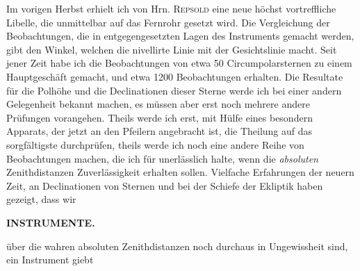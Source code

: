 \par\indent Im vorigen Herbst erhielt ich von Hrn. \textsc{Repsold} eine neue höchst vortreffliche Libelle, die unmittelbar auf das Fernrohr gesetzt wird. Die Vergleichung der Beobachtungen, die in entgegengesetzten Lagen des Instruments gemacht werden, gibt den Winkel, welchen die nivellirte Linie mit der Gesichtslinie macht. Seit jener Zeit habe ich die Beobachtungen von etwa 50 Circumpolarsternen zu einem Hauptgeschäft gemacht, und etwa 1200 Beobachtungen erhalten. Die Resultate für die Polhöhe
und die Declinationen dieser Sterne werde ich bei einer andern Gelegenheit bekannt machen, es müssen aber erst noch mehrere andere Prüfungen vorangehen. Theils werde ich erst, mit Hülfe eines besondern Apparats, der jetzt an den Pfeilern angebracht ist, die Theilung auf das sorgfältigste durchprüfen, theils werde ich noch eine andere Reihe von Beobachtungen machen, die ich für unerlässlich
halte, wenn die \emph{absoluten} Zenithdistanzen Zuverlässigkeit erhalten sollen. Vielfache Erfahrungen der
neuern Zeit, an Declinationen von Sternen und bei der Schiefe der Ekliptik haben gezeigt, dass wir \par
\clearpage
\endgroup
\begingroup
\pagestyle{empty}
\newcommand{\GaussVICitation}[2]{%
  \begin{center}
  \parbox{#1\linewidth}{%
    \centering\footnotesize\frenchspacing
    \hrule height .3pt\relax\vspace{2.5pt}
    #2\par
    \vspace{2.5pt}\hrule height .3pt\relax
  }%
  \end{center}
  \par\nobreak\medskip
}
\newcommand{\GaussVIGathering}[2]{%
  \fancypagestyle{gaussVIGathering}{%
    \fancyhf{}%
    \renewcommand{\headrulewidth}{0pt}%
    \renewcommand{\footrulewidth}{0pt}%
    \fancyfoot[C]{\makebox[\textwidth][l]{%
      \hspace*{.025\textwidth}{\footnotesize\bfseries #1}\hfill
      {\normalsize\bfseries\textls[90]{#2}}\hspace*{.18\textwidth}}}%
  }%
  \thispagestyle{gaussVIGathering}%
}
\noindent{}%
\makebox[12mm][l]{}%
\parbox[t]{\dimexpr\linewidth-24mm\relax}{\centering\footnotesize\bfseries INSTRUMENTE.\par}%
\par\nobreak\medskip
\noindent über die wahren absoluten Zenithdistanzen noch durchaus in Ungewissheit sind, ein Instrument giebt
